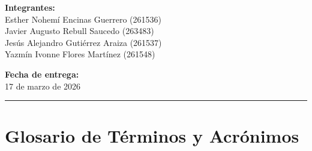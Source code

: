 \documentclass[12pt, letterpaper]{article}
\begin{document}
\begin{titlepage}
\begin{center}
    {\large\bfseries\color{azulUACJ} Integrantes:}\\[0.15cm]
    {\large
      Esther Nohemí Encinas Guerrero (261536)\\[0.1cm]
      Javier Augusto Rebull Saucedo (263483)\\[0.1cm]
      Jesús Alejandro Gutiérrez Araiza (261537)\\[0.1cm]
      Yazmín Ivonne Flores Martínez (261548)
    }

    \vfill

    {\large\bfseries\color{azulUACJ} Fecha de entrega:}\\[0.15cm]
    {\large 17 de marzo de 2026}

    \vspace{0.3cm}

    {\color{azulUACJ}\rule{\textwidth}{2pt}}

  \end{center}
\end{titlepage}

\newpage
\tableofcontents

\newpage
\section*{Glosario de Términos y Acrónimos}
\end{document}
